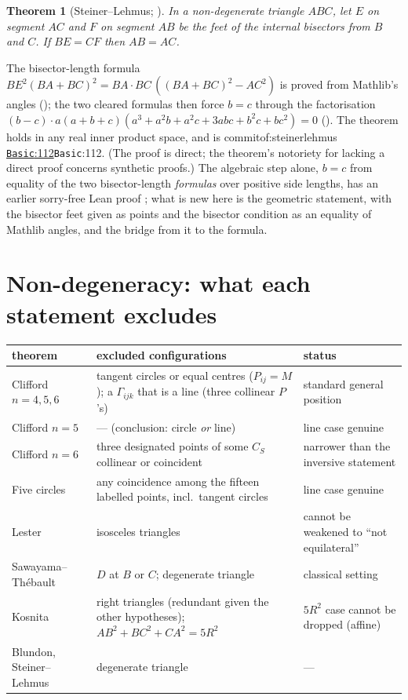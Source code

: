 \documentclass[11pt]{article}
\newtheorem{theorem}{Theorem}
\theoremstyle{definition}
\theoremstyle{remark}
\newcommand{\commitof}[1]{\csname commitof:#1\endcsname}
\newcommand{\repo}[1]{https://github.com/jpbald93/#1}
\newcommand{\src}[4]{\ifcsname commitof:#1\endcsname
  \href{\repo{#1}/blob/\commitof{#1}/#2/#3.lean\#L#4}{\texttt{#3}:#4}\else\texttt{#3}:#4\fi}
\begin{document}
\begin{theorem}[Steiner--Lehmus; ]\label{thm:steiner}
In a non-degenerate triangle $ABC$, let $E$ on segment $AC$ and $F$ on segment $AB$ be the feet of
the internal bisectors from $B$ and $C$. If $BE=CF$ then $AB=AC$.
\end{theorem}
The bisector-length formula $BE^2(BA+BC)^2 = BA\cdot BC\,((BA+BC)^2-AC^2)$ is proved from Mathlib's
angles (); the two cleared formulas then force $b=c$ through the
factorisation $(b-c)\cdot a(a+b+c)(a^3+a^2b+a^2c+3abc+b^2c+bc^2)=0$
(). The theorem holds in any real inner product space, and is
\src{steinerlehmus}{SteinerLehmus}{Basic}{112}. (The proof is direct; the theorem's notoriety for
lacking a direct proof \cite{gilbert1963,coxeter1967} concerns synthetic proofs.) The algebraic step
alone, $b=c$ from equality of the two bisector-length \emph{formulas} over positive side lengths, has
an earlier sorry-free Lean proof \cite{leangeniusSL}; what is new here is the geometric statement, with
the bisector feet given as points and the bisector condition as an equality of Mathlib angles, and the
bridge  from it to the formula.

\section{Non-degeneracy: what each statement excludes}\label{sec:degen}

\begin{center}\small
\begin{tabular}{p{2.6cm}p{6.2cm}p{5.2cm}}
\toprule
theorem & excluded configurations & status\\
\midrule
Clifford $n=4,5,6$ & tangent circles or equal centres ($P_{ij}=M$); a $\Gamma_{ijk}$ that is a line
(three collinear $P$'s) & standard general position\\
Clifford $n=5$ & --- (conclusion: circle \emph{or} line) & line case genuine\\
Clifford $n=6$ & three designated points of some $C_S$ collinear or coincident & narrower than the inversive statement\\
Five circles & any coincidence among the fifteen labelled points, incl.\ tangent circles & line case genuine\\
Lester & isosceles triangles & cannot be weakened to ``not equilateral''\\
Sawayama--Th\'ebault & $D$ at $B$ or $C$; degenerate triangle & classical setting\\
Kosnita & right triangles (redundant given the other hypotheses); $AB^2+BC^2+CA^2=5R^2$ & $5R^2$ case cannot be dropped (affine)\\
Blundon, Steiner--Lehmus & degenerate triangle & ---\\
\bottomrule
\end{tabular}
\end{center}
\end{document}
